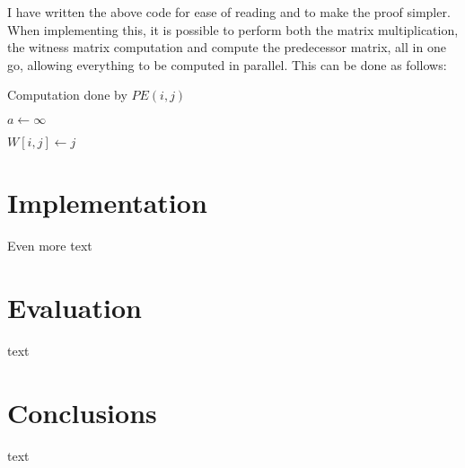 \documentclass[a4paper,12pt,oneside,openright]{report}
\begin{document}
I have written the above code for ease of reading and to make the proof simpler.
When implementing this, it is possible to perform both the matrix multiplication,
the witness matrix computation and compute the predecessor matrix, all in one go,
allowing everything to be computed in parallel. This can be done as follows:

\begin{algorithm}
    \caption{Computation done by $PE(i,j)$}\label{alg:two}

    $a \gets \infty$

    $W[i, j] \gets j$




\end{algorithm}







\chapter{Implementation}
Even more text
\chapter{Evaluation}
text
\chapter{Conclusions}
text
\end{document}
